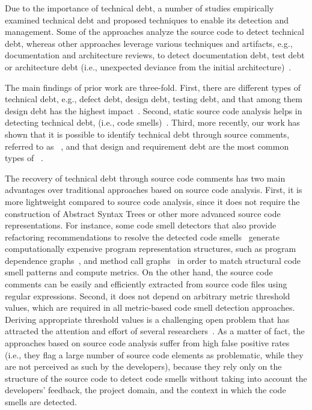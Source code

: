 Due to the importance of technical debt, a number of studies empirically examined technical debt and proposed techniques to enable its detection and management. Some of the approaches analyze the source code to detect technical debt, whereas other approaches leverage various techniques and artifacts, e.g., documentation and architecture reviews, to detect documentation debt, test debt or architecture debt (i.e., unexpected deviance from the initial architecture)~\cite{Alves2016IST,Xiao2016ICSE}.

The main findings of prior work are three-fold. First, there are different types of technical debt, e.g., defect debt, design debt, testing debt, and that among them design debt has the highest impact~\cite{Alves2014MTD,Marinescu2012IBM}. Second, static source code analysis helps in detecting technical debt, (i.e., code smells)~\cite{Marinescu2004ICSM,Marinescu2010CSMR,Zazworka2013CSE}. Third, more recently, our work has shown that it is possible to identify technical debt through source comments, referred to as  \SATD~\cite{Potdar2014ICSME}, and that design and requirement debt are the most common types of \SATD~\cite{Maldonado2015MTD}.

The recovery of technical debt through source code comments has two main advantages over traditional approaches based on source code analysis. First, it is more lightweight compared to source code analysis, since it does not require the construction of Abstract Syntax Trees or other more advanced source code representations. For instance, some code smell detectors that also provide refactoring recommendations to resolve the detected code smells~\cite{Tsantalis2011TSE,Tsantalis2015TSE} generate computationally expensive program representation structures, such as program dependence graphs~\cite{Graf2010SCAM}, and method call graphs~\cite{Ali2012ECOOP} in order to match structural code smell patterns and compute metrics. On the other hand, the source code comments can be easily and efficiently extracted from source code files using regular expressions. Second, it does not depend on arbitrary metric threshold values, which are required in all metric-based code smell detection approaches. Deriving appropriate threshold values is a challenging open problem that has attracted the attention and effort of several researchers~\cite{Oliveira2014CSMR,Fontana2015WETSoM,Fontana2015EMSE}. As a matter of fact, the approaches based on source code analysis suffer from high false positive rates~\cite{Fontana2016SANER} (i.e., they flag a large number of source code elements as problematic, while they are not perceived as such by the developers), because they rely only on the structure of the source code to detect code smells without taking into account the developers' feedback, the project domain, and the context in which the code smells are detected.


